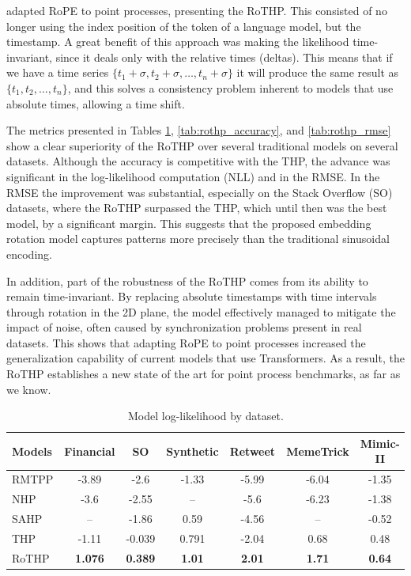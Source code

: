      adapted RoPE to point processes, presenting the \gls{RoTHP}. This consisted of no longer using the index position of the token of a language model, but the timestamp. A great benefit of this approach was making the likelihood time-invariant, since it deals only with the relative times (deltas). This means that if we have a time series $\{t_1 + \sigma, t_2+\sigma, \dots, t_n+\sigma\}$ it will produce the same result as $\{t_1, t_2, \dots, t_n\}$, and this solves a consistency problem inherent to models that use absolute times, allowing a time shift.

    The metrics presented in Tables \ref{tab:rothp_nll}, \ref{tab:rothp_accuracy}, and \ref{tab:rothp_rmse} show a clear superiority of the RoTHP over several traditional models on several datasets. Although the accuracy is competitive with the THP, the advance was significant in the log-likelihood computation (NLL) and in the RMSE. In the RMSE the improvement was substantial, especially on the Stack Overflow (SO) datasets, where the RoTHP surpassed the THP, which until then was the best model, by a significant margin. This suggests that the proposed embedding rotation model captures patterns more precisely than the traditional sinusoidal encoding.

    In addition, part of the robustness of the RoTHP comes from its ability to remain time-invariant. By replacing absolute timestamps with time intervals through rotation in the 2D plane, the model effectively managed to mitigate the impact of noise, often caused by synchronization problems present in real datasets. This shows that adapting RoPE to point processes increased the generalization capability of current models that use Transformers. As a result, the RoTHP establishes a new state of the art for point process benchmarks, as far as we know.

    \begin{table}[h]
        \centering
        \caption{Model log-likelihood by dataset.}
        \label{tab:rothp_nll}
        \begin{tabular}{lcccccc}
            \toprule
            \textbf{Models} & \textbf{Financial} & \textbf{SO} & \textbf{Synthetic} & \textbf{Retweet} & \textbf{MemeTrick} & \textbf{Mimic-II} \\
            \midrule
            RMTPP   & -3.89  & -2.6   & -1.33 & -5.99 & -6.04 & -1.35 \\
            NHP     & -3.6   & -2.55  & --    & -5.6  & -6.23 & -1.38 \\
            SAHP    & --     & -1.86  & 0.59  & -4.56 & --    & -0.52 \\
            THP     & -1.11  & -0.039 & 0.791 & -2.04 & 0.68  & 0.48  \\
            RoTHP   & \textbf{1.076}  & \textbf{0.389}  & \textbf{1.01}  & \textbf{2.01}  & \textbf{1.71}  & \textbf{0.64}  \\
            \bottomrule
        \end{tabular}
    \end{table}

